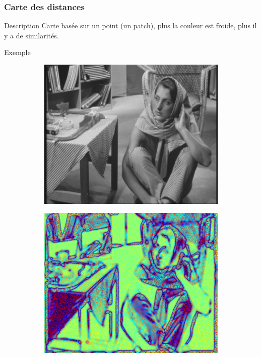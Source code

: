 \documentclass{beamer}
\begin{document}
\begin{frame}
    \frametitle{Carte des distances}
    \begin{block}{Description}
        Carte basée sur un point (un patch), plus la couleur est froide, plus il y a de similarités.
    \end{block}
    \begin{exampleblock}{Exemple}
        \begin{figure}[h]
            \centering
            \hfill
            \begin{subfigure}{0.4\textwidth}
                \includegraphics[width=\textwidth]{img/barbara}
                \caption{}
            \end{subfigure}
            \hfill
            \begin{subfigure}{0.4\textwidth}
                \includegraphics[width=\textwidth]{img/barbara_distanceMap}
                \caption{}
            \end{subfigure}
            \hfill
        \end{figure}
    \end{exampleblock}
\end{frame}
\end{document}
